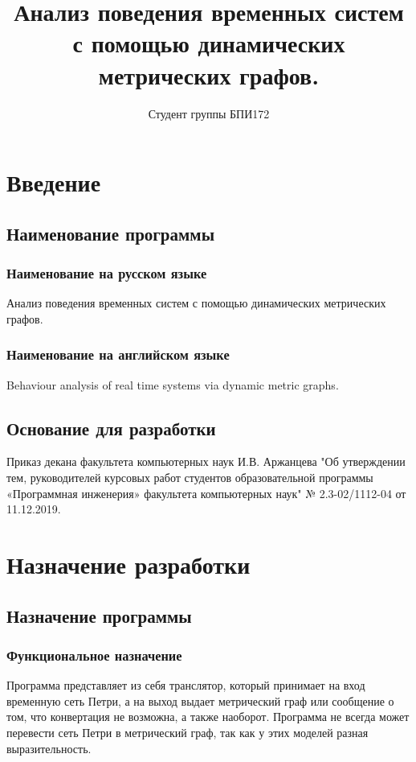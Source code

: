 \documentclass{../TechDoc}
\title{Анализ поведения временных систем с помощью динамических метрических графов.}
\author{Студент группы БПИ172}{А. А. Измайлов}
\begin{document}
	\maketitle
	\tableofcontents
	
	\section{Введение}
	\subsection{Наименование программы}
	\subsubsection{Наименование на русском языке}
	Анализ поведения временных систем с помощью динамических метрических графов.
	\subsubsection{Наименование на английском языке}
	Behaviour analysis of real time systems via dynamic metric graphs.
	
	\subsection{Основание для разработки}
		Приказ декана факультета компьютерных наук И.В. Аржанцева "Об утверждении тем, руководителей курсовых работ студентов образовательной программы «Программная инженерия» факультета компьютерных наук" № 2.3-02/1112-04 от 11.12.2019.
	
	\section{Назначение разработки}
	\subsection{Назначение программы}
	\subsubsection{Функциональное назначение}
	Программа представляет из себя транслятор, который принимает на вход временную сеть Петри\cite{PetriNet}, а на выход выдает метрический граф\cite{MGraphs} или сообщение о том, что конвертация не возможна, а также наоборот. Программа не всегда может перевести сеть Петри в метрический граф, так как у этих моделей разная выразительность.
\end{document}
